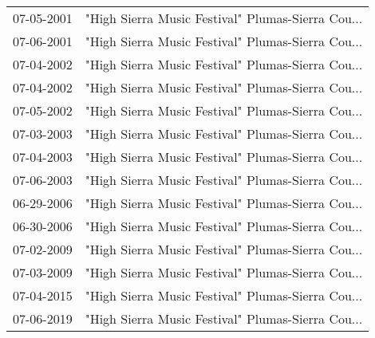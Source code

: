\begin{supertabular}{ll}
 07-05-2001 &  "High Sierra Music Festival" Plumas-Sierra Cou... \\
 07-06-2001 &  "High Sierra Music Festival" Plumas-Sierra Cou... \\
 07-04-2002 &  "High Sierra Music Festival" Plumas-Sierra Cou... \\
 07-04-2002 &  "High Sierra Music Festival" Plumas-Sierra Cou... \\
 07-05-2002 &  "High Sierra Music Festival" Plumas-Sierra Cou... \\
 07-03-2003 &  "High Sierra Music Festival" Plumas-Sierra Cou... \\
 07-04-2003 &  "High Sierra Music Festival" Plumas-Sierra Cou... \\
 07-06-2003 &  "High Sierra Music Festival" Plumas-Sierra Cou... \\
 06-29-2006 &  "High Sierra Music Festival" Plumas-Sierra Cou... \\
 06-30-2006 &  "High Sierra Music Festival" Plumas-Sierra Cou... \\
 07-02-2009 &  "High Sierra Music Festival" Plumas-Sierra Cou... \\
 07-03-2009 &  "High Sierra Music Festival" Plumas-Sierra Cou... \\
 07-04-2015 &  "High Sierra Music Festival" Plumas-Sierra Cou... \\
 07-06-2019 &  "High Sierra Music Festival" Plumas-Sierra Cou... \\
\end{supertabular}
